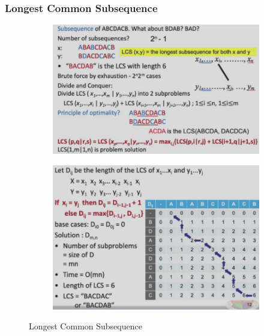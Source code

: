 \subsubsection{Longest Common Subsequence}

\begin{figure}[H]
    \centering
    \begin{subfigure}{0.309\textwidth}
        \centering
        \includegraphics[width=\textwidth]{pic/DAA8/Longest Common Subsequence}
    \end{subfigure}
    \begin{subfigure}{0.309\textwidth}
        \centering
        \includegraphics[width=\textwidth]{pic/DAA8/Longest Common Subsequence1}
    \end{subfigure}
    \caption{Longest Common Subsequence}
\end{figure}

